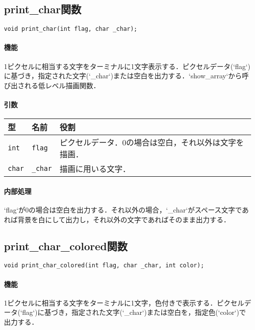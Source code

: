 \documentclass[uplatex]{jsarticle}
\begin{document}
\subsection{print\_char関数}
\texttt{void print\_char(int flag, char \_char);}
\paragraph{機能}
1ピクセルに相当する文字をターミナルに1文字表示する．ピクセルデータ(`flag`)に基づき，指定された文字(`\_char`)または空白を出力する．`show\_array`から呼び出される低レベル描画関数．

\paragraph{引数}
\begin{center}
    \begin{tabular}{|l|l|p{7cm}|}
        \hline
        \textbf{型} & \textbf{名前} & \textbf{役割} \\ \hline
        \texttt{int} & \texttt{flag} & ピクセルデータ．0の場合は空白，それ以外は文字を描画． \\ \hline
        \texttt{char} & \texttt{\_char} & 描画に用いる文字． \\ \hline
    \end{tabular}
\end{center}

\paragraph{内部処理}
`flag`が0の場合は空白を出力する．それ以外の場合，`\_char`がスペース文字であれば背景を白にして出力し，それ以外の文字であればそのまま出力する．

\subsection{print\_char\_colored関数}
\texttt{void print\_char\_colored(int flag, char \_char, int color);}
\paragraph{機能}
1ピクセルに相当する文字をターミナルに1文字，色付きで表示する．ピクセルデータ(`flag`)に基づき，指定された文字(`\_char`)または空白を，指定色(`color`)で出力する．
\end{document}
